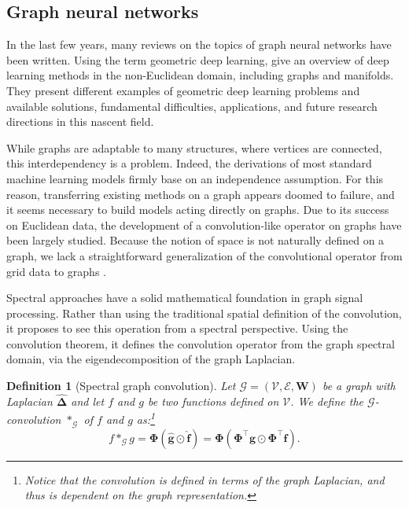 \documentclass{article}
\newtheorem{definition}{Definition}[section]
\begin{document}
\subsection{Graph neural networks} \label{sec:graph_neural_networks}

In the last few years, many reviews on the topics of graph neural networks have been written. Using the term geometric deep learning, \citet{bronstein2017geometric} give an overview of deep learning methods in the non-Euclidean domain, including graphs and manifolds. They present different examples of geometric deep learning problems and available solutions, fundamental difficulties, applications, and future research directions in this nascent field. 


While graphs are adaptable to many structures, where vertices are connected, this interdependency is a problem. Indeed, the derivations of most standard machine learning models firmly base on an independence assumption. For this reason, transferring existing methods on a graph appears doomed to failure, and it seems necessary to build models acting directly on graphs. Due to its success on Euclidean data, the development of a convolution-like operator on graphs have been largely studied. Because the notion of space is not naturally defined on a graph, we lack a straightforward generalization of the convolutional operator from grid data to graphs \citep{scarselli2008graph, bruna2013spectral, henaff2015deep, defferrard2016chebnet, kipf2016gcn, masci2015geodesic, boscaini2016learning, monti2017geometric}.

Spectral approaches have a solid mathematical foundation in graph signal processing. Rather than using the traditional spatial definition of the convolution, it proposes to see this operation from a spectral perspective. Using the convolution theorem, it defines the convolution operator from the graph spectral domain, via the eigendecomposition of the graph Laplacian.

\begin{definition}[Spectral graph convolution]
Let $\mathcal{G} = (\mathcal{V}, \mathcal{E}, \boldsymbol{W})$ be a graph with Laplacian $\boldsymbol{\hat{\Delta}}$ and let $f$ and $g$ be two functions defined on $\mathcal{V}$. We define the $\mathcal{G}$-convolution $*_{\mathcal{G}}$ of $f$ and $g$ as:\footnote{Notice that the convolution is defined in terms of the graph Laplacian, and thus is dependent on the graph representation.}
\begin{equation}
f *_{\mathcal{G}} g = \boldsymbol{\Phi} (\boldsymbol{\hat{g}} \odot \boldsymbol{\hat{f}}) = \boldsymbol{\Phi} (\boldsymbol{\Phi}^{\top} \boldsymbol{g} \odot \boldsymbol{\Phi}^{\top} \boldsymbol{f}).
\end{equation}
\end{definition}
\end{document}
